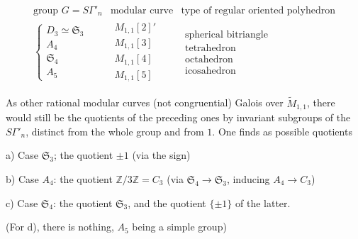 \[
\begin{array}{lll}
\text{group }G=S\Gamma'_n & \text{modular curve} & \text{type of regular oriented polyhedron}\\[.5em]
\left\{\begin{array}{l}D_3\simeq\mathfrak S_3\\ A_4\\ \mathfrak S_4\\ A_5\end{array}\right.
&\begin{array}{l}M_{1,1}[2]'\\M_{1,1}[3]\\M_{1,1}[4]\\M_{1,1}[5]\end{array}
&\begin{array}{l}\text{spherical bitriangle}\\\text{tetrahedron}\\\text{octahedron}\\\text{icosahedron}\end{array}
\end{array}
\tag{75}
\]

As other rational modular curves (not congruential)
Galois over $\widetilde M_{1,1}$, there would still be
the quotients of the preceding ones by
invariant subgroups of the $S\Gamma'_n$, distinct from the whole group and from $1$.
One finds as possible quotients

\noindent a) Case $\mathfrak S_3$; the quotient $\pm1$ (via the sign)

\noindent b) Case $A_4$: the quotient $\mathbb Z/3\mathbb Z=C_3$
(via $\mathfrak S_4\to\mathfrak S_3$, inducing $A_4\to C_3$)

\noindent c) Case $\mathfrak S_4$: the quotient $\mathfrak S_3$, and the quotient $\{\pm1\}$ of the latter.

(For d), there is nothing, $A_5$ being a simple group)


